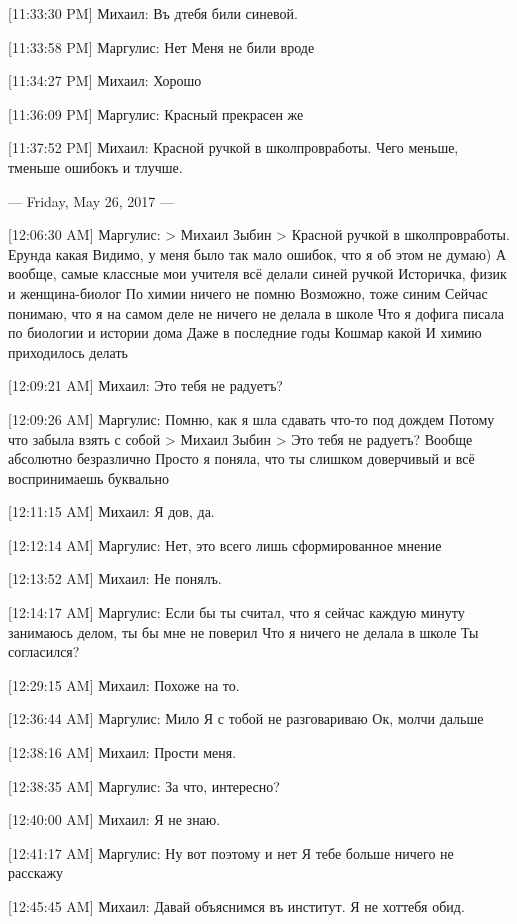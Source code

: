 \documentclass{article}
\newcommand{\yat}{{\fontencoding{X2}\selectfont\cyryat}} %
\begin{document}
{[11:33:30 PM] Михаил:
Въ д\yatтств\yat тебя били синевой.

[11:33:58 PM] Маргулис:
Нет
 Меня не били вроде

[11:34:27 PM] Михаил:
Хорошо

[11:36:09 PM] Маргулис:
Красный прекрасен же

[11:37:52 PM] Михаил:
Красной ручкой в школ\yat пров работы.
 Ч его меньше, т меньше ошибокъ и т лучше.

--- Friday, May 26, 2017 ---

[12:06:30 AM] Маргулис:
> Михаил Зыбин
> Красной ручкой в школ\yat пров работы.
Ерунда какая
 Видимо, у меня было так мало ошибок, что я об этом не думаю)
 А вообще, самые классные мои учителя всё делали синей ручкой
 Историчка, физик и женщина-биолог
 По химии ничего не помню
 Возможно, тоже синим
 Сейчас понимаю, что я на самом деле не ничего не делала в школе
 Что я дофига писала по биологии и истории дома
 Даже в последние годы
 Кошмар какой
 И химию приходилось делать

[12:09:21 AM] Михаил:
Это тебя не радуетъ?

[12:09:26 AM] Маргулис:
Помню, как я шла сдавать что-то под дождем
 Потому что забыла взять с собой
> Михаил Зыбин
> Это тебя не радуетъ?
Вообще абсолютно безразлично
 Просто я поняла, что ты слишком доверчивый и всё воспринимаешь буквально

[12:11:15 AM] Михаил:
Я дов, да.

[12:12:14 AM] Маргулис:
Нет, это всего лишь сформированное мнение

[12:13:52 AM] Михаил:
Не понялъ.

[12:14:17 AM] Маргулис:
Если бы ты считал, что я сейчас каждую минуту занимаюсь делом, ты бы мне не поверил
 Что я ничего не делала в школе
 Ты согласился?

[12:29:15 AM] Михаил:
Похоже на то.

[12:36:44 AM] Маргулис:
Мило
 Я с тобой не разговариваю
 Ок, молчи дальше

[12:38:16 AM] Михаил:
Прости меня.

[12:38:35 AM] Маргулис:
За что, интересно?

[12:40:00 AM] Михаил:
Я не знаю.

[12:41:17 AM] Маргулис:
Ну вот поэтому и нет
 Я тебе больше ничего не расскажу

[12:45:45 AM] Михаил:
Давай объяснимся въ институт\yat. Я не хот тебя обид.

}
\end{document}
